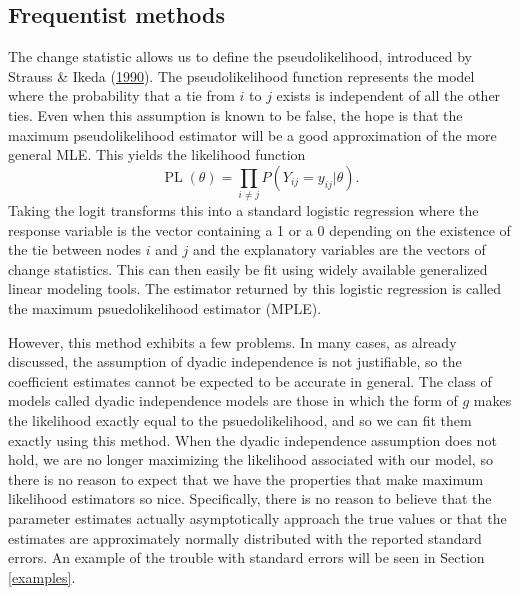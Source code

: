 \documentclass[12pt,twoside]{reedthesis}
\theoremstyle{definition}
\theoremstyle{definition}
\theoremstyle{remark}
\begin{document}
\subsection{Frequentist methods}\label{frequentist-methods}

The change statistic allows us to define the pseudolikelihood,
introduced by Strauss \& Ikeda
(\protect\hyperlink{ref-Strauss1990}{1990}). The pseudolikelihood
function represents the model where the probability that a tie from
\(i\) to \(j\) exists is independent of all the other ties. Even when
this assumption is known to be false, the hope is that the maximum
pseudolikelihood estimator will be a good approximation of the more
general MLE. This yields the likelihood function
\begin{equation*} 
\operatorname{PL}(\theta) = \prod_{i \neq j}P(Y_{ij} = y_{ij} | \theta). 
\end{equation*}
Taking the logit transforms this into a standard logistic regression
where the response variable is the vector containing a 1 or a 0
depending on the existence of the tie between nodes \(i\) and \(j\) and
the explanatory variables are the vectors of change statistics. This can
then easily be fit using widely available generalized linear modeling
tools. The estimator returned by this logistic regression is called the
maximum psuedolikelihood estimator (MPLE).

However, this method exhibits a few problems. In many cases, as already
discussed, the assumption of dyadic independence is not justifiable, so
the coefficient estimates cannot be expected to be accurate in general.
The class of models called dyadic independence models are those in which
the form of \(g\) makes the likelihood exactly equal to the
psuedolikelihood, and so we can fit them exactly using this method. When
the dyadic independence assumption does not hold, we are no longer
maximizing the likelihood associated with our model, so there is no
reason to expect that we have the properties that make maximum
likelihood estimators so nice. Specifically, there is no reason to
believe that the parameter estimates actually asymptotically approach
the true values or that the estimates are approximately normally
distributed with the reported standard errors. An example of the trouble
with standard errors will be seen in Section \ref{examples}.
\end{document}
